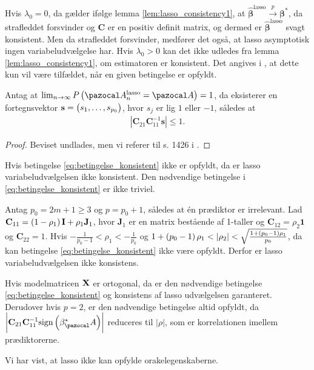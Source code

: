 Hvis $\lambda_0=0$, da gælder ifølge lemma \ref{lem:lasso_consistency1}, at $\hat{\boldsymbol{\beta}}^\text{lasso} \overset{p}{\rightarrow} \boldsymbol{\beta}^{*}$, da strafleddet forsvinder og $\mathbf{C}$ er en positiv definit matrix, og dermed er $\hat{\boldsymbol{\beta}}^\text{lasso}$ svagt konsistent. Men da strafleddet forsvinder, medfører det også, at lasso asymptotisk ingen variabeludvælgelse har. Hvis $\lambda_0>0$ kan det ikke udledes fra lemma \ref{lem:lasso_consistency1}, om estimatoren er konsistent. Det angives i \citep{adaptive_lasso}, at dette kun vil være tilfældet, når en given betingelse er opfyldt. 
%
%
\begin{thm}
Antag at \(\lim_{n \rightarrow \infty} P \del{\A_n^\text{lasso} = \A}=1\), da eksisterer en fortegnsvektor \(\mathbf{s} = \del{s_1, \ldots, s_{p_0}}\), hvor \(s_j\) er lig \(1\) eller \(-1\), således at
\begin{align}
\left\vert \mathbf{C}_{21} \mathbf{C}_{11}^{-1} \mathbf{s} \right\vert \leq 1. \label{eq:betingelse_konsistent}
\end{align}
\end{thm}
%
\begin{proof}
Beviset undlades, men vi referer til s. 1426 i \citep{adaptive_lasso}.
\end{proof}
%
Hvis betingelse \eqref{eq:betingelse_konsistent} ikke er opfyldt, da er lasso variabeludvælgelsen ikke konsistent.
Den nødvendige betingelse i \eqref{eq:betingelse_konsistent} er ikke triviel.

\begin{cor}
Antag \(p_0 = 2m+1 \geq 3\) og \(p=p_0+1\), således at én prædiktor er irrelevant.
Lad \(\mathbf{C}_{11} = \del{1- \rho_1} \mathbf{I} + \rho_1 \mathbf{J}_1\), hvor \(\mathbf{J}_1\) er en matrix bestående af 1-taller og  \(\mathbf{C}_{12} =  \rho_2 \mathbf{1}\) og \(\mathbf{C}_{22}= 1\). Hvis \(-\frac{1}{p_0 - 1} < \rho_1 < -\frac{1}{p_0}\) og \(1 + \del{p_0 -1} \rho_1 < \vert \rho_2 \vert < \sqrt{\frac{1 + \del{p_0-1}\rho_1}{p_0}}\), da kan betingelse \eqref{eq:betingelse_konsistent} ikke være opfyldt.
Derfor er lasso variabeludvælgelsen ikke konsistens.
\end{cor}

Hvis modelmatricen \(\mathbf{X}\) er ortogonal, da er den nødvendige betingelse \eqref{eq:betingelse_konsistent} og konsistens af lasso udvælgelsen garanteret.
Derudover hvis \(p=2\), er den nødvendige betingelse altid opfyldt, da \(\left\vert \mathbf{C}_{21} \mathbf{C}_{11}^{-1} \text{sign} \del{\beta^*_\A} \right\vert\) reduceres til \(\vert \rho \vert\), som er korrelationen imellem prædiktorerne.

Vi har vist, at lasso ikke kan opfylde orakelegenskaberne.
